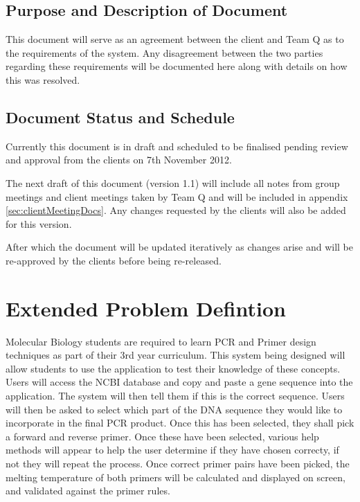 \documentclass{l3deliverable}
\begin{document}
\subsection{Purpose and Description of Document}

This document will serve as an agreement between the client and Team
Q as to the requirements of the system. Any disagreement between the
two parties regarding these requirements will be documented here along
with details on how this was resolved.

\subsection{Document Status and Schedule}

Currently this document is in draft and scheduled to be finalised
pending review and approval from the clients on 7th November 2012.

The next draft of this document (version 1.1) will include all notes from group
meetings and client meetings taken by Team Q and will be included in
appendix \ref{sec:clientMeetingDocs}.
Any changes requested by the clients will also be added for this version.

After which the document will be updated iteratively as changes
arise and will be re-approved by the clients before being re-released.

\section{Extended Problem Defintion}
\label{sec:extendedDefinition}


Molecular Biology students are required to learn PCR and Primer design
techniques as part of their 3rd year curriculum. 
This system being designed will allow students to use the application
to test their knowledge of these concepts. 
Users will access the NCBI database and copy and paste a gene sequence
into the application. 
The system will then tell them if this is the correct sequence. 
Users will then be asked to select which part of the DNA sequence they
would like to incorporate in the final PCR product.
Once this has been selected, they shall pick a forward and reverse
primer. 
Once these have been selected, various help methods will appear to
help the user determine if they have chosen correcty, if not they will
repeat the process. 
Once correct primer pairs have been picked, the melting temperature of
both primers will be calculated and displayed on screen, and validated
against the primer rules.
\end{document}
